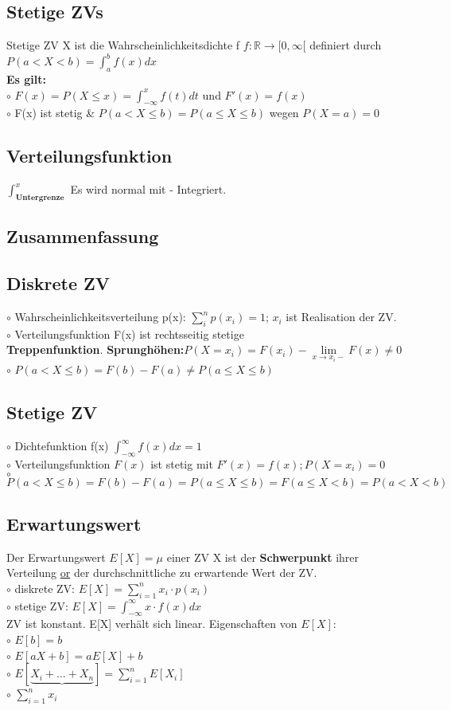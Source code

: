 \subsection{Stetige ZVs}
Stetige ZV X ist die Wahrscheinlichkeitsdichte f $ f : \mathbb{R} \rightarrow [0,\infty[$ definiert durch\\
$P(a < X < b) = \int_{a}^{b} f(x) dx$\\
\textbf{Es gilt:}\\
  $\circ$ $F(x) = P(X \leq x) = \int_{-\infty}^{x} f(t) dt$ und $F'(x) = f(x)$\\
  $\circ$ F(x) ist stetig \& $P(a < X \leq b) = P(a \leq X \leq b)$ wegen $P(X = a) = 0$
\subsection{Verteilungsfunktion}
$\int_{\textbf{Untergrenze}}^{x}$ Es wird normal mit - Integriert.
\subsection{Zusammenfassung}
\subsection{Diskrete ZV}
  $\circ$ Wahrscheinlichkeitsverteilung p(x): $\sum_{i}^{n} p(x_{i}) = 1$; 
    $x_{i}$ ist Realisation der ZV.\\
  $\circ$ Verteilungsfunktion F(x) ist rechtsseitig  stetige\\ \textbf{Treppenfunktion}. \textbf{Sprunghöhen:}$P(X = x_{i}) = F(x_{i}) - \lim\limits_{x \to x_{i}-} F(x) \ne 0$\\
  $\circ$ $P(a < X \le b) = F(b)- F(a) \ne P(a \le X \le b)$
\subsection{Stetige ZV}
  $\circ$ Dichtefunktion f(x) $\int_{-\infty}^{\infty} f(x) dx = 1$\\
  $\circ$ Verteilungsfunktion $F(x)$ ist stetig mit $F'(x) = f(x); P(X = x_{i}) = 0$\\
  $\circ$ $P(a < X \leq b ) = F(b) - F(a) = P( a \leq X \leq b) = F(a \leq X < b) = P(a < X < b)$
\subsection{Erwartungswert}
Der Erwartungswert $ E[X] = \mu $ einer ZV X ist der \textbf{Schwerpunkt} ihrer Verteilung \underline{or} der durchschnittliche zu erwartende Wert der ZV.\\
  $\circ$ diskrete ZV: $E[X] = \sum_{i=1}^{n} x_{i} \cdot p(x_{i})$\\
  $\circ$ stetige ZV: $E[X] = \int_{-\infty}^{\infty} x \cdot f(x) dx$\\
ZV ist konstant. E[X] verhält sich linear. Eigenschaften von $E[X]$:\\
  $\circ$ $E[b] = b$\\
  $\circ$ $E[aX + b] = aE[X] + b$\\
  $\circ$ $E[\underbrace{X_{i} + ... + X_{n}}] = \sum_{i=1}^{n} E[X_{i}]$\\
  $\circ$ $\sum_{i=1}^{n} x_{i}$
